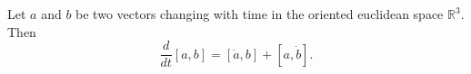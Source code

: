 Let $a$ and $b$ be two vectors changing with time in the oriented euclidean space $\mathbb{R}^3$. Then
$$\frac{d}{dt} [a, b] = [\dot{a}, b] + [a, \dot{b}].$$
